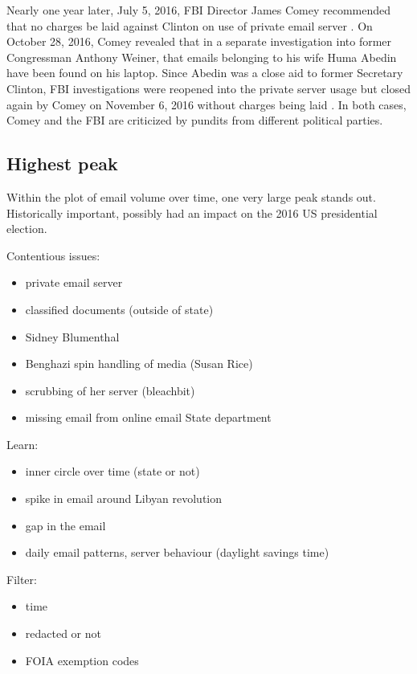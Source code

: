\documentclass[journal]{vgtc}                %
\begin{document}
Nearly one year later, July 5, 2016,  FBI Director James Comey recommended that no charges be laid against Clinton on use of private email server \cite{nochargeFBI}.  On October 28, 2016, Comey revealed that in a separate investigation into former Congressman Anthony Weiner, that emails belonging to his wife Huma Abedin have been found on his laptop.  Since Abedin was a close aid to former Secretary Clinton, FBI investigations were reopened into the private server usage but closed again by Comey on November 6, 2016 without charges being laid \cite{nochargeFBINov}.  In both cases, Comey and the FBI are criticized by pundits from different political parties.

\subsection{Highest peak}
Within the plot of email volume over time, one very large peak stands out.
Historically important,  possibly had an impact on the 2016 US presidential election.

Contentious issues:
\begin{itemize}
\item private email server
\item classified documents (outside of state)
\item Sidney Blumenthal
\item Benghazi spin handling of media (Susan Rice)

\item scrubbing of her server (bleachbit)
\item missing email from online email State department
\end{itemize}


Learn:
\begin{itemize}
\item inner circle over time (state or not)
\item spike in email around Libyan revolution
\item gap in the email
\item daily email patterns, server behaviour (daylight savings time)
\end{itemize}

  
 Filter:
\begin{itemize}
\item time
\item redacted or not
\item FOIA exemption codes
\end{itemize}
\end{document}
